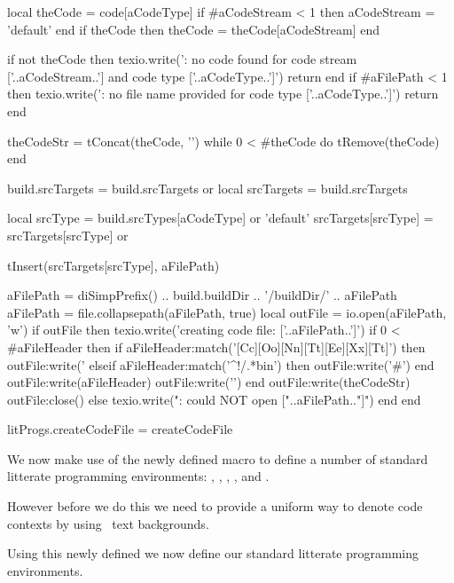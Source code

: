   local theCode = code[aCodeType]
  if #aCodeStream < 1 then aCodeStream = 'default' end
  if theCode then theCode = theCode[aCodeStream] end

  if not theCode then
    texio.write('\nERROR: no code found for code stream ['..aCodeStream..'] and code type ['..aCodeType..']\n\n')
    return
  end
  if #aFilePath < 1 then
    texio.write('\nERROR: no file name provided for code type ['..aCodeType..']\n\n')
    return
  end

  theCodeStr = tConcat(theCode, '\n\n')
  while 0 < #theCode do tRemove(theCode) end

  build.srcTargets = build.srcTargets or { }
  local srcTargets = build.srcTargets

  local srcType       = build.srcTypes[aCodeType] or 'default'
  srcTargets[srcType] = srcTargets[srcType] or { }

  tInsert(srcTargets[srcType], aFilePath)

  aFilePath = diSimpPrefix() .. build.buildDir .. '/buildDir/' .. aFilePath
  aFilePath = file.collapsepath(aFilePath, true)
  local outFile = io.open(aFilePath, 'w')
  if outFile then
    texio.write('creating code file: ['..aFilePath..']\n')
    if 0 < #aFileHeader then
      if aFileHeader:match('[Cc][Oo][Nn][Tt][Ee][Xx][Tt]') then
        outFile:write('%
      elseif aFileHeader:match('^!/.*bin') then
        outFile:write('#')
      end
      outFile:write(aFileHeader)
      outFile:write('\n\n')
    end
    outFile:write(theCodeStr)
    outFile:close()
  else
    texio.write("\nERROR: could NOT open ["..aFilePath.."]\n")
  end
end

litProgs.createCodeFile = createCodeFile
\stopLuaCode

\stopTestSuite

We now make use of the newly defined  macro to 
define a number of standard litterate programming environments: 
, , , , 
 and . 

However before we do this we need to provide a uniform way to denote code 
contexts by using \ConTeXt\ text backgrounds. 

\startMkIVCode
{}
\setuptextbackground%
  [LitProgFrame]%
  [location=paragraph, background=color, backgroundcolor=gray]
\stopMkIVCode

Using this newly defined  we now define our standard 
litterate programming environments. 

